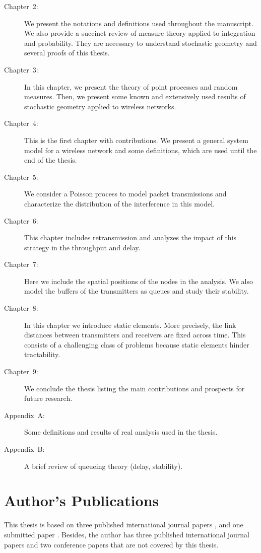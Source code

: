\begin{description}
    \item[Chapter~2:] We present the notations and definitions used throughout the manuscript. We also provide a succinct review of measure theory applied to integration and probability. They are necessary to understand stochastic geometry and several proofs of this thesis.
    
    \item[Chapter~3:] In this chapter, we present the theory of point processes and random measures. Then, we present some known and extensively used results of stochastic geometry applied to wireless networks.
    
    \item[Chapter~4:] This is the first chapter with contributions.
    We present a general system model for a wireless network and some definitions, which are used until the end of the thesis.
    
    \item[Chapter~5:] We consider a Poisson process to model packet transmissions and characterize the distribution of the interference in this model.
    
    \item[Chapter~6:] This chapter includes retransmission and analyzes the impact of this strategy in the throughput and delay.
    
    \item[Chapter~7:] Here we include the spatial positions of the nodes in the analysis. We also model the buffers of the transmitters as queues and study their stability.
    
    \item[Chapter~8:] In this chapter we introduce static elements. More precisely, the link distances between transmitters and receivers are fixed across time. This consists of a challenging class of problems because static elements hinder tractability.
    
    \item[Chapter~9:] We conclude the thesis listing the main contributions and prospects for future research.
    
    \item[Appendix~A:] Some definitions and results of real analysis used in the thesis.
    
    \item[Appendix~B:] A brief review of queueing theory (delay, stability).
\end{description}

\section{Author's Publications}

This thesis is based on three published international journal papers \cite{dester2018,dester2021unique, dester2021retrans}, and one submitted paper \cite{dester2021part}.
%
Besides, the author has three published international journal papers \cite{dester2017stationary, francisco2020, bergamo2021} and two conference papers \cite{dester2018mtc, helder2019lora} that are not covered by this thesis.
